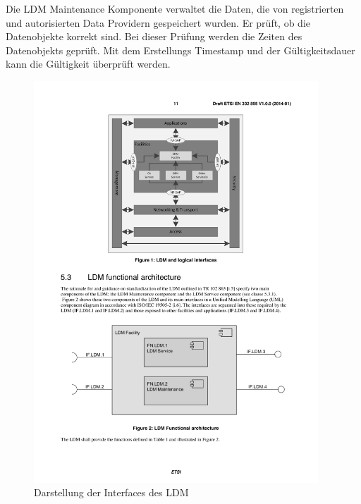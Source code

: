 Die \ac{LDM} Maintenance Komponente verwaltet die Daten, die von registrierten und autorisierten Data Providern gespeichert wurden. Er prüft, ob die Datenobjekte korrekt sind. Bei dieser Prüfung werden die Zeiten des Datenobjekts geprüft. Mit dem Erstellungs Timestamp und der Gültigkeitsdauer  kann die Gültigkeit überprüft werden. 

\begin{figure}[htbp]
	\includegraphics[width=0.95\textwidth]{content/images/04_facilitylayer/ldmFunktionelleInterfaces.pdf}
	\caption{Darstellung der Interfaces des LDM \cite{en302895}}
	\label{fig:ldmInterfaces}
\end{figure}



